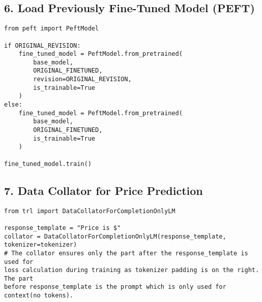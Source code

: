 \documentclass[a4paper, 12pt]{article}
\begin{document}
\subsection*{6. Load Previously Fine-Tuned Model (PEFT)}
\begin{tcolorbox}[colback=yellow!5!white, colframe=yellow!75!black, title=Resume LoRA Checkpoint]
\begin{verbatim}
from peft import PeftModel

if ORIGINAL_REVISION:
    fine_tuned_model = PeftModel.from_pretrained(
        base_model,
        ORIGINAL_FINETUNED,
        revision=ORIGINAL_REVISION,
        is_trainable=True
    )
else:
    fine_tuned_model = PeftModel.from_pretrained(
        base_model,
        ORIGINAL_FINETUNED,
        is_trainable=True
    )

fine_tuned_model.train()
\end{verbatim}
\end{tcolorbox}

\subsection*{7. Data Collator for Price Prediction}
\begin{tcolorbox}[colback=green!5!white, colframe=green!75!black, title=Data Collator]
\begin{verbatim}
from trl import DataCollatorForCompletionOnlyLM

response_template = "Price is $"
collator = DataCollatorForCompletionOnlyLM(response_template, 
tokenizer=tokenizer)
# The collator ensures only the part after the response_template is used for
loss calculation during training as tokenizer padding is on the right. The part 
before response_template is the prompt which is only used for context(no tokens).
\end{verbatim}
\end{tcolorbox}

\end{document}
